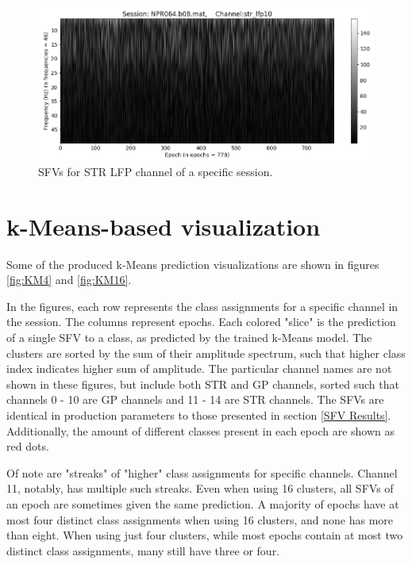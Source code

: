 \documentclass{kththesis}
\begin{document}
\begin{figure}[H]
    \centering
    \centerline{\includegraphics[width=1.1\textwidth]{images/STR2.png}}
    \caption{SFVs for STR LFP channel of a specific session.}
    \label{fig:STR2}
\end{figure}

\section{k-Means-based visualization}\label{KM Results}

Some of the produced k-Means prediction visualizations are shown in figures \ref{fig:KM4} and \ref{fig:KM16}.

In the figures, each row represents the class assignments for a specific channel in the session.
The columns represent epochs.
Each colored "slice" is the prediction of a single SFV to a class, as predicted by the trained k-Means model.
The clusters are sorted by the sum of their amplitude spectrum, such that higher class index indicates higher sum of amplitude.
The particular channel names are not shown in these figures, but include both STR and GP channels, sorted such that channels 0 - 10 are GP channels and 11 - 14 are STR channels.
The SFVs are identical in production parameters to those presented in section \ref{SFV Results}.
Additionally, the amount of different classes present in each epoch are shown as red dots.

Of note are "streaks" of "higher" class assignments for specific channels.
Channel 11, notably, has multiple such streaks.
Even when using 16 clusters, all SFVs of an epoch are sometimes given the same prediction.
A majority of epochs have at most four distinct class assignments when using 16 clusters, and none has more than eight. 
When using just four clusters, while most epochs contain at most two distinct class assignments, many still have three or four.
\end{document}
